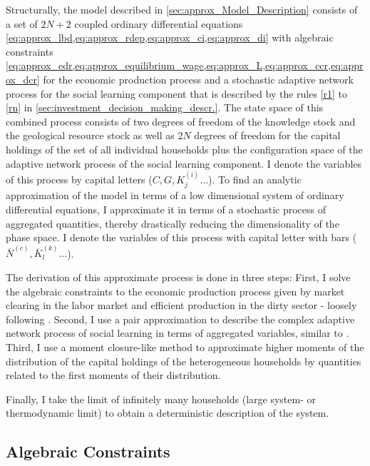 Structurally, the model described in \cref{sec:approx_Model_Description} consists of a set of $2N+2$ coupled ordinary differential equations 
\cref{eq:approx_lbd,eq:approx_rdep,eq:approx_ci,eq:approx_di} 
with algebraic constraints 
\cref{eq:approx_edr,eq:approx_equilibrium_wage,eq:approx_L,eq:approx_ccr,eq:approx_dcr} 
for the economic production process and a stochastic adaptive network process for the social learning component that is described by the rules \ref{r1} to \ref{rn} in \cref{sec:investment_decision_making_descr.}. The state space of this combined process consists of two degrees of freedom of the knowledge stock and the geological resource stock as well as $2N$ degrees of freedom for the capital holdings of the set of all individual households plus the configuration space of the adaptive network process of the social learning component. I denote the variables of this process by capital letters ($C, G, K_j^{(i)}\dots$).
To find an analytic approximation of the model in terms of a low dimensional system of ordinary differential equations, I approximate it in terms of a stochastic process of aggregated quantities, thereby drastically reducing the dimensionality of the phase space. I denote the variables of this process with capital letter with bars ($\overbar{N}^{(c)}, \overbar{K}_l^{(k)}\dots$).

The derivation of this approximate process is done in three steps: First, I solve the algebraic constraints to the economic production process given by market clearing in the labor market and efficient production in the dirty sector - loosely following \cite{Nitzbon2017}. Second, I use a pair approximation to describe the complex adaptive network process of social learning in terms of aggregated variables, similar to \cite{Rogers2012}. Third, I use a moment closure-like method to approximate higher moments of the distribution of the capital holdings of the heterogeneous households by quantities related to the first moments of their distribution.

Finally, I take the limit of infinitely many households (large system- or thermodynamic limit) to obtain a deterministic description of the system.

\subsection{Algebraic Constraints}

